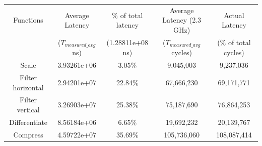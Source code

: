 \documentclass[
  course = {{ESE532 System-on-a-Chip}},
  quartile = {{}},
  assignment = 2,
  name = {{Sheil Sarda}},
  studentnumber = {{}},
  email = {{sheils@seas.upenn.edu}},
  firstexercise = 1
]{aga-homework}
\begin{document}
\subexercise 
\begin{center}
  \begin{tabular}{||c | c | c | c | c||} 
    \hline
    Functions & Average Latency       & \% of total latency & Average Latency (2.3 GHz)    & Actual Latency     \\ [0.5ex] 
           & ($T_{measured\_avg}$ ns) & (1.28811e+08 ns)     & ($T_{measured\_avg}$ cycles) & (\% of total cycles)  \\ [0.5ex] 
    \hline\hline
    Scale         & 3.93261e+06  & 3.05\% & 9,045,003  & 9,237,036 \\ 
    \hline
    Filter horizontal   & 2.94201e+07  & 22.84\% & 67,666,230  & 69,171,771 \\
    \hline
    Filter vertical   & 3.26903e+07  & 25.38\% & 75,187,690  & 76,864,253 \\
    \hline
    Differentiate     & 8.56184e+06  & 6.65\% & 19,692,232  & 20,139,767  \\
    \hline
    Compress       & 4.59722e+07  & 35.69\% & 105,736,060  & 108,087,414    \\ [1ex] 
    \hline
  \end{tabular}
\end{center}

\exercise
\end{document}

